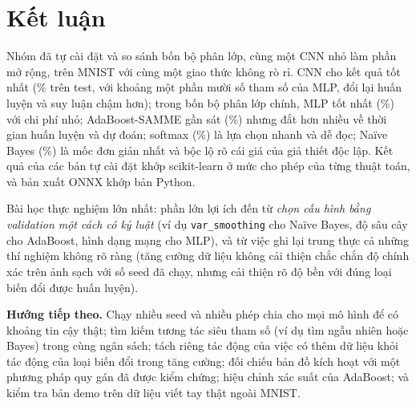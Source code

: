 \section{Kết luận}
\label{sec:conclusion}

Nhóm đã tự cài đặt và so sánh bốn bộ phân lớp, cùng một CNN nhỏ làm phần mở rộng, trên MNIST với cùng một giao thức không rò rỉ. CNN cho kết quả tốt nhất (\accTestCNN\% trên test, với khoảng một phần mười số tham số của MLP, đổi lại huấn luyện và suy luận chậm hơn); trong bốn bộ phân lớp chính, MLP tốt nhất (\accTestMLP\%) với chi phí nhỏ; AdaBoost-SAMME gần sát (\accTestADA\%) nhưng đắt hơn nhiều về thời gian huấn luyện và dự đoán; softmax (\accTestSM\%) là lựa chọn nhanh và dễ đọc; Naïve Bayes (\accTestNB\%) là mốc đơn giản nhất và bộc lộ rõ cái giá của giả thiết độc lập. Kết quả của các bản tự cài đặt khớp scikit-learn ở mức cho phép của từng thuật toán, và bản xuất ONNX khớp bản Python.

Bài học thực nghiệm lớn nhất: phần lớn lợi ích đến từ \emph{chọn cấu hình bằng validation một cách có kỷ luật} (ví dụ \texttt{var\_smoothing} cho Naïve Bayes, độ sâu cây cho AdaBoost, hình dạng mạng cho MLP), và từ việc ghi lại trung thực cả những thí nghiệm không rõ ràng (tăng cường dữ liệu không cải thiện chắc chắn độ chính xác trên ảnh sạch với số seed đã chạy, nhưng cải thiện rõ độ bền với đúng loại biến đổi được huấn luyện).

\textbf{Hướng tiếp theo.} Chạy nhiều seed và nhiều phép chia cho mọi mô hình để có khoảng tin cậy thật; tìm kiếm tương tác siêu tham số (ví dụ tìm ngẫu nhiên hoặc Bayes) trong cùng ngân sách; tách riêng tác động của việc có thêm dữ liệu khỏi tác động của loại biến đổi trong tăng cường; đối chiếu bản đồ kích hoạt với một phương pháp quy gán đã được kiểm chứng; hiệu chỉnh xác suất của AdaBoost; và kiểm tra bản demo trên dữ liệu viết tay thật ngoài MNIST.
